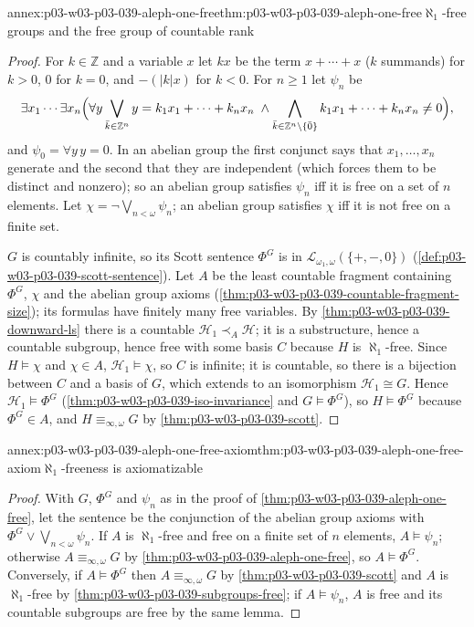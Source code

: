 \begin{annexitem}{annex:p03-w03-p03-039-aleph-one-free}{thm:p03-w03-p03-039-aleph-one-free}{\(\aleph_1\)-free groups and the free group of countable rank}
\begin{proof}
For \(k\in\mathbb Z\) and a variable \(x\) let \(kx\) be the term
\(x+\cdots+x\) (\(k\) summands) for \(k>0\), \(0\) for \(k=0\), and
\(-(\lvert k\rvert x)\) for \(k<0\). For \(n\ge1\) let \(\psi_n\) be
\[
\exists x_1\cdots\exists x_n\Bigl(\forall y\bigvee_{\bar k\in\mathbb Z^n}y=k_1x_1+\cdots+k_nx_n\;\wedge\bigwedge_{\bar k\in\mathbb Z^n\setminus\{\bar0\}}k_1x_1+\cdots+k_nx_n\ne0\Bigr),
\]
and \(\psi_0=\forall y\,y=0\). In an abelian group the first conjunct says
that \(x_1,\dots,x_n\) generate and the second that they are independent
(which forces them to be distinct and nonzero); so an abelian group
satisfies \(\psi_n\) iff it is free on a set of \(n\) elements. Let
\(\chi=\neg\bigvee_{n<\omega}\psi_n\); an abelian group satisfies \(\chi\) iff
it is not free on a finite set.

\(G\) is countably infinite, so its Scott sentence \(\Phi^G\) is in
\(\mathcal L_{\omega_1,\omega}(\{+,-,0\})\)
(\cref{def:p03-w03-p03-039-scott-sentence}). Let \(A\) be the least countable
fragment containing \(\Phi^G\), \(\chi\) and the abelian group axioms
(\cref{thm:p03-w03-p03-039-countable-fragment-size}); its formulas have
finitely many free variables. By \cref{thm:p03-w03-p03-039-downward-ls} there
is a countable \(\mathcal H_1\prec_A\mathcal H\); it is a substructure, hence
a countable subgroup, hence free with some basis \(C\) because \(H\) is
\(\aleph_1\)-free. Since \(H\models\chi\) and \(\chi\in A\),
\(\mathcal H_1\models\chi\), so \(C\) is infinite; it is countable, so there
is a bijection between \(C\) and a basis of \(G\), which extends to an
isomorphism \(\mathcal H_1\cong G\). Hence \(\mathcal H_1\models\Phi^G\)
(\cref{thm:p03-w03-p03-039-iso-invariance} and \(G\models\Phi^G\)), so
\(H\models\Phi^G\) because \(\Phi^G\in A\), and
\(H\equiv_{\infty,\omega}G\) by \cref{thm:p03-w03-p03-039-scott}.
\end{proof}
\end{annexitem}

\begin{annexitem}{annex:p03-w03-p03-039-aleph-one-free-axiom}{thm:p03-w03-p03-039-aleph-one-free-axiom}{\(\aleph_1\)-freeness is axiomatizable}
\begin{proof}
With \(G\), \(\Phi^G\) and \(\psi_n\) as in the proof of
\cref{thm:p03-w03-p03-039-aleph-one-free}, let the sentence be the
conjunction of the abelian group axioms with
\(\Phi^G\vee\bigvee_{n<\omega}\psi_n\). If \(A\) is \(\aleph_1\)-free and free
on a finite set of \(n\) elements, \(A\models\psi_n\); otherwise
\(A\equiv_{\infty,\omega}G\) by \cref{thm:p03-w03-p03-039-aleph-one-free}, so
\(A\models\Phi^G\). Conversely, if \(A\models\Phi^G\) then
\(A\equiv_{\infty,\omega}G\) by \cref{thm:p03-w03-p03-039-scott} and \(A\) is
\(\aleph_1\)-free by \cref{thm:p03-w03-p03-039-subgroups-free}; if
\(A\models\psi_n\), \(A\) is free and its countable subgroups are free by
the same lemma.
\end{proof}
\end{annexitem}

